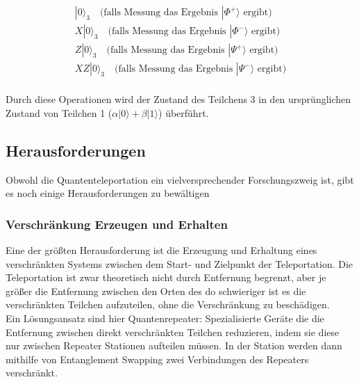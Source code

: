 \begin{gather*}
    |0\rangle_3 \quad \text{(falls Messung das Ergebnis } |\Phi^+\rangle\text{ ergibt)}\\
    X|0\rangle_3 \quad \text{(falls Messung das Ergebnis } |\Phi^-\rangle\text{ ergibt)}\\
    Z|0\rangle_3 \quad \text{(falls Messung das Ergebnis } |\Psi^+\rangle\text{ ergibt)}\\
    XZ|0\rangle_3 \quad \text{(falls Messung das Ergebnis } |\Psi^-\rangle\text{ ergibt)}\\
\end{gather*}

Durch diese Operationen wird der Zustand des Teilchens 3 in den ursprünglichen Zustand von Teilchen 1 (\( \alpha |0\rangle + \beta |1\rangle \)) überführt.


\subsection{Herausforderungen}\label{subsec:challenges}
Obwohl die Quantenteleportation ein vielversprechender Forschungszweig ist, gibt es noch einige Herausforderungen zu bewältigen

\subsubsection{Verschränkung Erzeugen und Erhalten}
Eine der größten Herausforderung ist die Erzeugung und Erhaltung eines verschränkten Systems zwischen dem Start- und Zielpunkt
der Teleportation.
Die Teleportation ist zwar theoretisch nicht durch Entfernung begrenzt, aber je größer die Entfernung zwischen den Orten
des do schwieriger ist es die verschränkten Teilchen aufzuteilen, ohne die Verschränkung zu beschädigen.\\

Ein Lösungsansatz sind hier Quantenrepeater: Spezialisierte Geräte die die Entfernung zwischen direkt verschränkten Teilchen reduzieren,
indem sie diese nur zwischen Repeater Stationen aufteilen müssen.
In der Station werden dann mithilfe von Entanglement Swapping zwei Verbindungen des Repeaters verschränkt.


